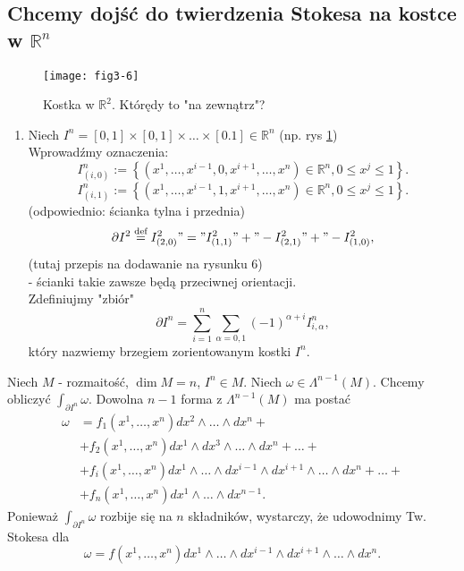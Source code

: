 \documentclass[../main.tex]{subfiles}
\begin{document}
    \subsection{Chcemy dojść do twierdzenia Stokesa na kostce w $\mathbb{R}^n$}
    \begin{figure}[h]
        \centering
        \texttt{[image: fig3-6]}
        \caption{Kostka w $\mathbb{R}^2$. Którędy to "na zewnątrz"?}
        \label{fig:fig3-6}
    \end{figure}
    \begin{enumerate}
        \item Niech $I^n = [0,1]\times[0,1]\times\ldots\times[0.1]\in \mathbb{R}^n$ (np. rys \ref{fig:fig3-6})\\
Wprowadźmy oznaczenia:
\[
    I^n_{(i,0)} := \left\{ \left( x^1,\ldots,x^{i-1},0,x^{i+1},\ldots,x^n \right) \in \mathbb{R}^n, 0\le x^j\le 1 \right\}
.\]
\[
    I^n_{(i,1)} := \left\{ \left( x^1,\ldots,x^{i-1},1,x^{i+1},\ldots,x^n \right) \in \mathbb{R}^n, 0\le x^j\le 1 \right\}
.\]
(odpowiednio: ścianka tylna i przednia)
\[
    \partial I^2 \overset{\text{def}}{=} I^2_{(2,0)} "=" I^2_{(1,1)} "+" - I^2_{(2,1)} "+" - I^2_{(1,0)}
,\]
(tutaj przepis na dodawanie na rysunku 6)\\
- ścianki takie zawsze będą przeciwnej orientacji.\\
Zdefiniujmy "zbiór"
\[
    \partial I^n = \sum_{i = 1}^n \sum_{\alpha = 0,1} (-1)^{\alpha + i}I^n_{i,\alpha}
,\]
który nazwiemy brzegiem zorientowanym kostki $I^n$.
    \end{enumerate}
        Niech $M$ - rozmaitość, $\dim M = n$, $I^n \in M$. Niech $\omega\in \Lambda^{n-1}(M)$. Chcemy obliczyć $\int_{\partial I^n}\omega$. Dowolna $n-1$ forma z $\Lambda^{n-1}(M)$ ma postać
        \begin{align*}
            \omega &= f_1(x^1,\ldots,x^n)dx^2\land\ldots\land dx^n +\\
            &+f_2(x^1,\ldots,x^n)dx^1\land dx^3\land\ldots\land dx^n + \ldots +\\
            &+ f_i(x^1,\ldots,x^n)dx^1\land\ldots\land dx^{i-1}\land dx^{i+1}\land \ldots\land dx^n + \ldots +\\
            &+ f_n(x^1,\ldots,x^n)dx^1\land\ldots\land dx^{n-1}
        .\end{align*}
        Ponieważ $\int_{\partial I^n}\omega$ rozbije się na $n$ składników, wystarczy, że udowodnimy Tw. Stokesa dla
        \[
            \omega = f(x^1,\ldots,x^n)dx^1\land \ldots\land dx^{i-1}\land dx^{i+1}\land \ldots \land dx^n
        .\]
\end{document}
